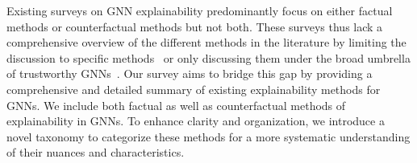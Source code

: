 Existing surveys on GNN explainability predominantly focus on either factual methods \cite{First-survey,survey2-prfe,survey5-li} or counterfactual methods \cite{survey-counter} but not both. 
These surveys thus lack a comprehensive overview of the different methods in the literature by limiting the discussion to specific methods~\cite{First-survey,survey5-li} or only discussing them under the broad umbrella of trustworthy GNNs~\cite{survey2-prfe, survey3-gl}.
Our survey aims to bridge this gap by providing a comprehensive and detailed summary of existing explainability methods for GNNs. We include both factual as well as counterfactual methods of explainability in GNNs. To enhance clarity and organization, we introduce a novel taxonomy to categorize these methods for a more systematic understanding of their nuances and characteristics. 